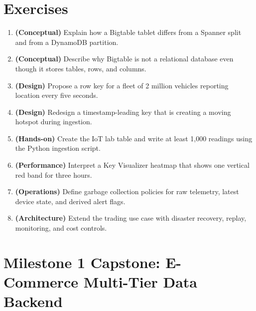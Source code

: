 \section{Exercises}
\begin{enumerate}
    \item \textbf{(Conceptual)} Explain how a Bigtable tablet differs from a Spanner split and from a DynamoDB partition.
    \item \textbf{(Conceptual)} Describe why Bigtable is not a relational database even though it stores tables, rows, and columns.
    \item \textbf{(Design)} Propose a row key for a fleet of 2 million vehicles reporting location every five seconds.
    \item \textbf{(Design)} Redesign a timestamp-leading key that is creating a moving hotspot during ingestion.
    \item \textbf{(Hands-on)} Create the IoT lab table and write at least 1,000 readings using the Python ingestion script.
    \item \textbf{(Performance)} Interpret a Key Visualizer heatmap that shows one vertical red band for three hours.
    \item \textbf{(Operations)} Define garbage collection policies for raw telemetry, latest device state, and derived alert flags.
    \item \textbf{(Architecture)} Extend the trading use case with disaster recovery, replay, monitoring, and cost controls.
\end{enumerate}

\section{Milestone 1 Capstone: E-Commerce Multi-Tier Data Backend}\label{sec:ch4-capstone}


